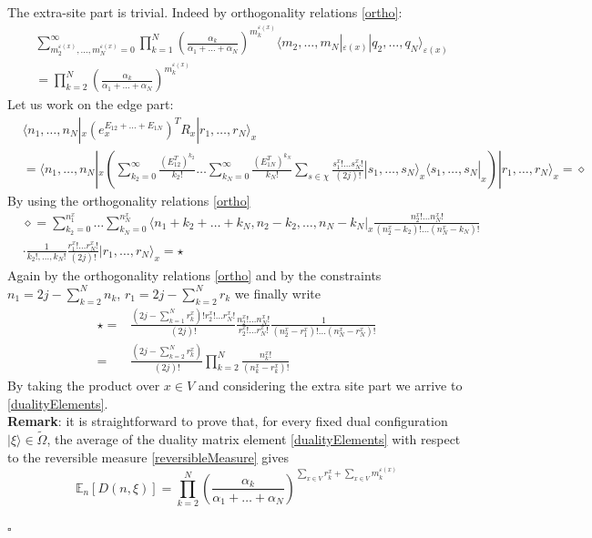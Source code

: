 \documentclass[11pt]{article}
\numberwithin{equation}{subsection}
\begin{document}
The extra-site part is trivial. Indeed by orthogonality relations \eqref{ortho}:
\begin{align*}
&\sum_{m_{2}^{\varepsilon(x)},\ldots,m_{N}^{\varepsilon(x)}=0}^{\infty}\prod_{k=1}^{N}\left(\frac{\alpha_{k}}{\alpha_{1}+\ldots+\alpha_{N}}\right)^{m_{k}^{\varepsilon(x)}}\langle m_{2},\ldots,m_{N}|_{\varepsilon(x)}|q_{2},\ldots,q_{N}\rangle_{\varepsilon(x)}\\&=
\prod_{k=2}^{N}\left(\frac{\alpha_{k}}{\alpha_{1}+\ldots+\alpha_{N}}\right)^{m_{k}^{\varepsilon(x)}}
\end{align*}
 Let us work on the edge part:
\begin{align*}
&\langle n_{1},\ldots,n_{N}|_{x}(e_{x}^{E_{12}+\ldots+E_{1N}})^{T}R_{x}|r_{1},\ldots,r_{N}\rangle_{x}\\&= \langle  n_{1},\ldots,n_{N}|_{x}\left(\sum_{k_{2}=0}^{\infty}\frac{(E_{12}^{T})^{k_{2}}}{k_{2}!}\ldots\sum_{k_{N}=0}^{\infty}\frac{(E_{1N}^{T})^{k_{N}}}{k_{N}!}\sum_{s\in\chi}\frac{s_{1}^{x}!\ldots s_{N}^{x}!}{(2j)!}|s_{1},\ldots,s_{N}\rangle_{x}\langle s_{1},\ldots,s_{N}|_{x}\right)|r_{1},\ldots,r_{N}\rangle_{x}=\diamond
\end{align*}
By using the orthogonality relations \eqref{ortho}
\begin{align*}&\diamond=
\sum_{k_{2}=0}^{n_{1}^{x}}\ldots\sum_{k_{N}=0}^{n_{N}^{x}}\langle n_{1}+k_{2}+\ldots+k_{N},n_{2}-k_{2},\ldots,n_{N}-k_{N}|_{x}\frac{n_{2}^{x}!\ldots n_{N}^{x}!}{(n_{2}^{x}-k_{2})!\ldots(n_{N}^{x}-k_{N})!}
\\&\cdot 
\frac{1}{k_{2}!,\ldots,k_{N}!}\frac{r_{1}^{x}!\ldots r_{N}^{x}!}{(2j)!}|r_{1},\ldots,r_{N}\rangle_{x}=\star
\end{align*}
Again by the orthogonality relations \eqref{ortho} and by the constraints $n_{1}=2j-\sum_{k=2}^{N}n_{k}$, $r_{1}=2j-\sum_{k=2}^{N}r_{k}$ we finally write
\begin{equation}
\begin{split}
\star=&\frac{(2j-\sum_{k=1}^{N}r_{k}^{x})!r_{2}^{x}!\ldots r_{N }^{x}!}{(2j)!}\frac{n_{2}^{x}!\ldots n_{N}^{x}!}{r_{2}^{x}!\ldots r_{N}^{x}!}\frac{1}{(n_{2}^{x}-r_{1}^{x})!\ldots (n_{N}^{x}-r_{N}^{x})!}\\=&
\frac{(2j-\sum_{k=2}^{N}r_{k}^{x})}{(2j)!}\prod_{k=2}^{N}\frac{n_{k}^{x}!}{(n_{k}^{x}-r_{k}^{x})!}
\end{split}
\end{equation}
By taking the product over $x\in V$ and considering the extra site part we arrive to \eqref{dualityElements}. \newline \\
\textbf{Remark}: it is straightforward to prove that, for every fixed dual configuration $|\xi\rangle \in \widetilde{\Omega}$, the average of the duality matrix  element \eqref{dualityElements} with respect to the reversible measure \eqref{reversibleMeasure} gives 
\begin{equation}
    \mathbb{E}_{n}\left[D(n,\xi)\right]=\prod_{k=2}^{N}\left(\frac{\alpha_{k}}{\alpha_{1}+\ldots+\alpha_{N}}\right)^{\sum_{x\in V}r_{k}^{x}+\sum_{x\in V}m_{k}^{\varepsilon(x)}}
\end{equation}
\begin{flushright}
    $\square$
\end{flushright}
\end{document}
